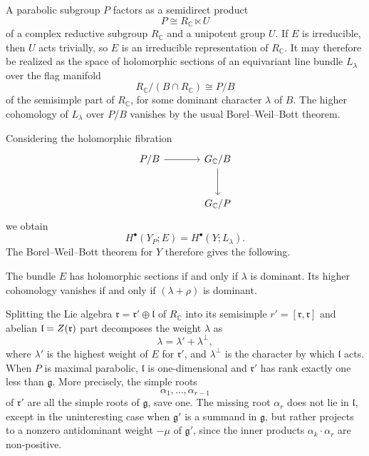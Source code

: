\documentclass[12pt]{article}
\begin{document}
A parabolic subgroup \(P\) factors as a semidirect product
\[
P \cong R_{\mathbb C}\ltimes U
\]
of a complex reductive subgroup \(R_{\mathbb C}\) and a unipotent group \(U\). If \(E\) is irreducible, then \(U\) acts trivially, so \(E\) is an irreducible representation of \(R_{\mathbb C}\). It may therefore be realized as the space of holomorphic sections of an equivariant line bundle \(L_\lambda\) over the flag manifold
\[
R_{\mathbb C}/(B\cap R_{\mathbb C}) \cong P/B
\]
of the semisimple part of \(R_{\mathbb C}\), for some dominant character \(\lambda\) of \(B\). The higher cohomology of \(L_\lambda\) over \(P/B\) vanishes by the usual Borel--Weil--Bott theorem.

Considering the holomorphic fibration
\[
\begin{tikzcd}[column sep=large, row sep=large]
P/B \arrow[r] & G_{\mathbb C}/B \arrow[d] \\
& G_{\mathbb C}/P
\end{tikzcd}
\]
we obtain
\[
H^\bullet(Y_P;E) = H^\bullet(Y;L_\lambda).
\]
The Borel--Weil--Bott theorem for \(Y\) therefore gives the following.


\begin{proposition}
The bundle \(E\) has holomorphic sections if and only if \(\lambda\) is dominant. Its higher cohomology vanishes if and only if \((\lambda+\rho)\) is dominant.
\end{proposition}

Splitting the Lie algebra $\mathfrak r = \mathfrak r' \oplus \mathfrak l$
of \(R_{\mathbb C}\) into its semisimple $r' = [\mathfrak r,\mathfrak r]$ and abelian $\mathfrak{l} = Z(\mathfrak r)$ part decomposes the weight \(\lambda\) as
\[
\lambda = \lambda' + \lambda^{\perp},
\]
where \(\lambda'\) is the highest weight of \(E\) for \(\mathfrak r'\), and \(\lambda^{\perp}\) is the character by which \(\mathfrak l\) acts. When \(P\) is maximal parabolic, \(\mathfrak l\) is one-dimensional and \(\mathfrak r'\) has rank exactly one less than \(\mathfrak g\). More precisely, the simple roots
\[
\alpha_1,\dots,\alpha_{r-1}
\]
of \(\mathfrak r'\) are all the simple roots of \(\mathfrak g\), save one. The missing root \(\alpha_r\) does not lie in \(\mathfrak l\), except in the uninteresting case when \(\mathfrak g'\) is a summand in \(\mathfrak g\), but rather projects to a nonzero antidominant weight \(-\mu\) of \(\mathfrak g'\), since the inner products $\alpha_k\cdot \alpha_r$ are non-positive.
\end{document}
